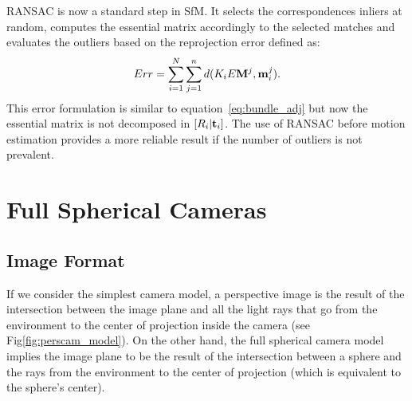 RANSAC is now a standard step in SfM. It selects the correspondences inliers at
random, computes the essential matrix accordingly to the selected matches and
evaluates the outliers based on the reprojection error defined as:
\begin{equation*}
	Err =  
	\sum_{i = 1}^N\sum_{j = 1}^n 
	d(K_iE\mathbf{M}^j, \mathbf{m}_i^j) \text{.}
\end{equation*}
This error formulation is similar to equation~\ref{eq:bundle_adj} but now the
essential matrix is not decomposed in $[R_i|\mathbf{t}_i]$.
The use of RANSAC before motion estimation provides a more reliable result if
the number of outliers is not prevalent.

\section{Full Spherical Cameras}
\subsection{Image Format}
If we consider the simplest camera model, 
a perspective image is the result of the intersection between the image plane 
and all the light rays that go from the environment to the center of 
projection inside the camera (see Fig\ref{fig:perscam_model}).
\label{fig:perscam_model}
On the other hand, the full spherical camera model implies the image plane 
to be the result of the intersection between a sphere and the rays from the 
environment to the center of projection (which is equivalent to the sphere's 
center).

